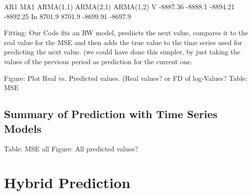 \begin{figure}[h]
    \centering
    \begin{adjustbox}{width=.95\textwidth,center}
    
    \end{adjustbox}
    \begin{adjustbox}{width=.95\textwidth,center}
    
    \end{adjustbox} 
    \caption{}
    \label{fig:INTC_V_ACF_log_returns}
\end{figure}{}

    AR1         MA1         ARMA(1,1)   ARMA(2,1)   ARMA(1,2)     
V   -8887.36    -8888.1     -8894.21    -8892.25 
In  8701.9      8701.9      -8699.91    -8697.9


Fitting: 
Our Code fits an RW model, prediicts the next value, compares it to the real value for the MSE and then adds the true value to the time series used for predicting the next value. (we could have done this simpler, by just taking the values of the previous period as prediction for the current one. 

Figure: Plot Real vs. Predicted values. (Real values? or FD of log-Values?
Table: MSE





\subsection{Summary of Prediction with Time Series Models}
Table: MSE all
Figure: All predicted values?


\section{Hybrid Prediction}

